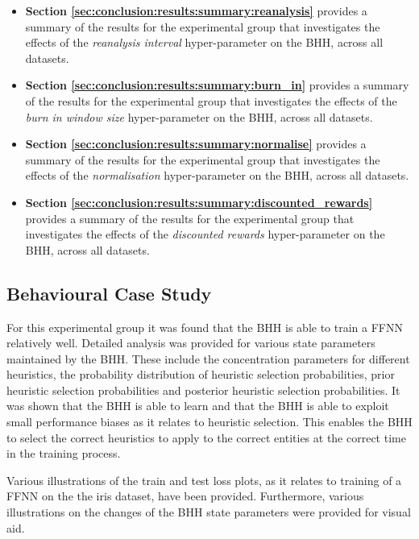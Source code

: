 \begin{itemize}
      \item \textbf{Section \ref{sec:conclusion:results:summary:reanalysis}} provides a summary of the results for the experimental group that investigates the effects of the \textit{reanalysis interval} hyper-parameter on the \acs{BHH}, across all datasets.

      \item \textbf{Section \ref{sec:conclusion:results:summary:burn_in}} provides a summary of the results for the experimental group that investigates the effects of the \textit{burn in window size} hyper-parameter on the \acs{BHH}, across all datasets.

      \item \textbf{Section \ref{sec:conclusion:results:summary:normalise}} provides a summary of the results for the experimental group that investigates the effects of the \textit{normalisation} hyper-parameter on the \acs{BHH}, across all datasets.

      \item \textbf{Section \ref{sec:conclusion:results:summary:discounted_rewards}} provides a summary of the results for the experimental group that investigates the effects of the \textit{discounted rewards} hyper-parameter on the \acs{BHH}, across all datasets.
\end{itemize}

\subsection{Behavioural Case Study}
\label{sec:conclusion:results:summary:case_study}

For this experimental group it was found that the \ac{BHH} is able to train a \acf{FFNN} relatively well. Detailed analysis was provided for various state parameters maintained by the \acs{BHH}. These include the concentration parameters for different heuristics, the probability distribution of heuristic selection probabilities, prior heuristic selection probabilities and posterior heuristic selection probabilities. It was shown that the \ac{BHH} is able to learn and that the \acs{BHH} is able to exploit small performance biases as it relates to heuristic selection. This enables the \acs{BHH} to select the correct heuristics to apply to the correct entities at the correct time in the training process.

Various illustrations of the train and test loss plots, as it relates to training of a \acs{FFNN} on the the iris dataset, have been provided. Furthermore, various illustrations on the changes of the \acs{BHH} state parameters were provided for visual aid.

